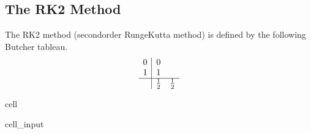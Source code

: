 \documentclass[letterpaper,10pt,english]{jupyterBook}
\begin{document}
\subsection{The RK2 Method}
\label{\detokenize{8_Appendices/8.1_Python:the-rk2-method}}
\sphinxAtStartPar
The RK2 method (second\sphinxhyphen{}order Runge\sphinxhyphen{}Kutta method) is defined by the following Butcher tableau.
\begin{align*}
    \begin{array}{c|cc}
        0 & 0 \\
        1 & 1 \\ \hline
        & \frac{1}{2} & \frac{1}{2}
    \end{array}
\end{align*}
\begin{sphinxuseclass}{cell}\begin{sphinxVerbatimInput}

\begin{sphinxuseclass}{cell_input}
\begin{sphinxVerbatim}[commandchars=\\\{\}]
    
      \PYG{p}{[}\PYG{p}{]}  \PYG{p}{[}\PYG{p}{]}  
      
          
         
    \PYG{p}{[}\PYG{p}{]}  
       
          \PYG{p}{[}\PYG{p}{]} \PYG{p}{[}\PYG{p}{]}
          \PYG{p}{[}\PYG{p}{]}   \PYG{p}{[}\PYG{p}{]}    
        \PYG{p}{[}\PYG{p}{]}  \PYG{p}{[}\PYG{p}{]}        
        
      
\end{sphinxVerbatim}

\end{sphinxuseclass}\end{sphinxVerbatimInput}

\end{sphinxuseclass}
\end{document}
